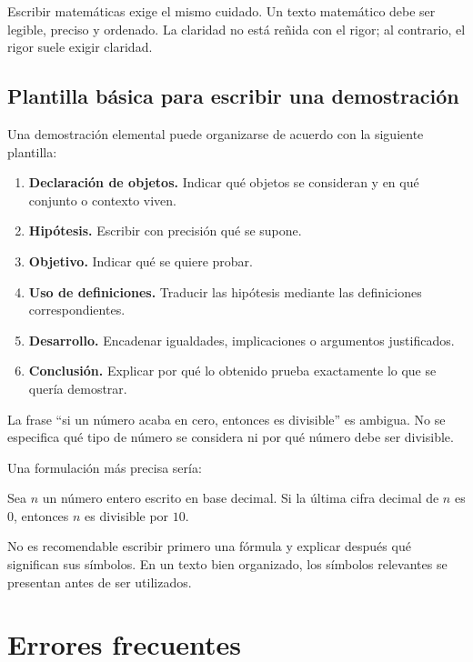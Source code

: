 Escribir matemáticas exige el mismo cuidado. Un texto matemático debe ser legible, preciso y ordenado. La claridad no está reñida con el rigor; al contrario, el rigor suele exigir claridad.

\subsection{Plantilla básica para escribir una demostración}
\label{subsec:plantilla-demostracion}

Una demostración elemental puede organizarse de acuerdo con la siguiente plantilla:

\begin{enumerate}
  \item \textbf{Declaración de objetos.} Indicar qué objetos se consideran y en qué conjunto o contexto viven.
  \item \textbf{Hipótesis.} Escribir con precisión qué se supone.
  \item \textbf{Objetivo.} Indicar qué se quiere probar.
  \item \textbf{Uso de definiciones.} Traducir las hipótesis mediante las definiciones correspondientes.
  \item \textbf{Desarrollo.} Encadenar igualdades, implicaciones o argumentos justificados.
  \item \textbf{Conclusión.} Explicar por qué lo obtenido prueba exactamente lo que se quería demostrar.
\end{enumerate}

\begin{ejemplo}
La frase ``si un número acaba en cero, entonces es divisible'' es ambigua. No se especifica qué tipo de número se considera ni por qué número debe ser divisible.

Una formulación más precisa sería:

Sea \(n\) un número entero escrito en base decimal. Si la última cifra decimal de \(n\) es \(0\), entonces \(n\) es divisible por \(10\).
\end{ejemplo}

\begin{advertencia}
No es recomendable escribir primero una fórmula y explicar después qué significan sus símbolos. En un texto bien organizado, los símbolos relevantes se presentan antes de ser utilizados.
\end{advertencia}

\section{Errores frecuentes}
\label{sec:errores-frecuentes-lenguaje}

